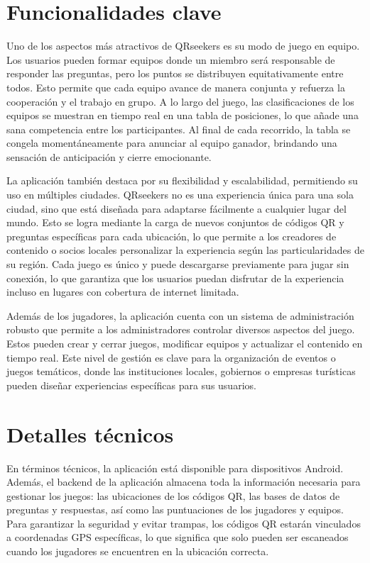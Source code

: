 \documentclass[letterpaper, 12pt]{report}
\begin{document}
\newpage

\section{Funcionalidades clave}
Uno de los aspectos más atractivos de QRseekers es su modo de juego en equipo. Los usuarios pueden formar equipos donde un miembro será responsable de responder las preguntas, pero los puntos se distribuyen equitativamente entre todos. Esto permite que cada equipo avance de manera conjunta y refuerza la cooperación y el trabajo en grupo. A lo largo del juego, las clasificaciones de los equipos se muestran en tiempo real en una tabla de posiciones, lo que añade una sana competencia entre los participantes. Al final de cada recorrido, la tabla se congela momentáneamente para anunciar al equipo ganador, brindando una sensación de anticipación y cierre emocionante.

La aplicación también destaca por su flexibilidad y escalabilidad, permitiendo su uso en múltiples ciudades. QRseekers no es una experiencia única para una sola ciudad, sino que está diseñada para adaptarse fácilmente a cualquier lugar del mundo. Esto se logra mediante la carga de nuevos conjuntos de códigos QR y preguntas específicas para cada ubicación, lo que permite a los creadores de contenido o socios locales personalizar la experiencia según las particularidades de su región. Cada juego es único y puede descargarse previamente para jugar sin conexión, lo que garantiza que los usuarios puedan disfrutar de la experiencia incluso en lugares con cobertura de internet limitada.

Además de los jugadores, la aplicación cuenta con un sistema de administración robusto que permite a los administradores controlar diversos aspectos del juego. Estos pueden crear y cerrar juegos, modificar equipos y actualizar el contenido en tiempo real. Este nivel de gestión es clave para la organización de eventos o juegos temáticos, donde las instituciones locales, gobiernos o empresas turísticas pueden diseñar experiencias específicas para sus usuarios.

\newpage

\section{Detalles técnicos}
En términos técnicos, la aplicación está disponible para dispositivos Android. Además, el backend de la aplicación almacena toda la información necesaria para gestionar los juegos: las ubicaciones de los códigos QR, las bases de datos de preguntas y respuestas, así como las puntuaciones de los jugadores y equipos. Para garantizar la seguridad y evitar trampas, los códigos QR estarán vinculados a coordenadas GPS específicas, lo que significa que solo pueden ser escaneados cuando los jugadores se encuentren en la ubicación correcta.
\end{document}
